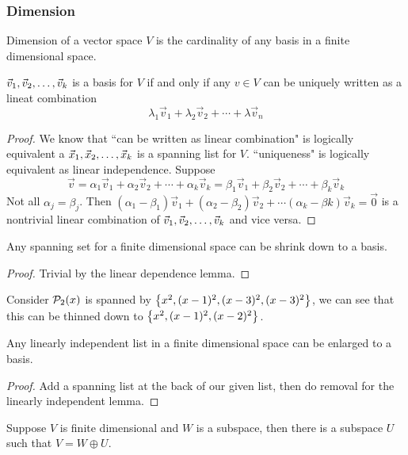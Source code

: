 \subsubsection{Dimension}
\begin{definition}
    Dimension of a vector space $V$ is the cardinality of any basis in a finite dimensional space.
\end{definition}
\begin{proposition}
    ${\vec v}_1,{\vec v}_2, \ldots, {\vec v}_{k}$ is a basis for $V$ if and only if any $v \in V$ can be uniquely written as a lineat combination
    \[ \lambda_1 \vec v_1 + \lambda_2 \vec v_2 + \cdots + \lambda \vec v_n \]
\end{proposition}
\begin{proof}
    We know that ``can be written  as linear combination" is logically equivalent a ${\vec x}_1,{\vec x}_2, \ldots, {\vec x}_{k}$ is a spanning list for $V$. ``uniqueness" is logically equivalent as linear independence. Suppose
    \[ \vec v = \alpha_1 \vec v_1 + \alpha_2 \vec v_2 + \cdots + \alpha_k \vec v_k = \beta_1 \vec v_1 + \beta_2 \vec v_2 + \cdots + \beta_k \vec v_k\]
    Not all $\alpha_j = \beta_j$. Then $(\alpha_1 -\beta_1) \vec v_1 + (\alpha_2 - \beta_2) \vec v_2 + \cdots (\alpha_k - \beta k) \vec v_k = \vec 0$ is a nontrivial linear combination of ${\vec v}_1,{\vec v}_2, \ldots, {\vec v}_{k}$ and vice versa. 
\end{proof}
\begin{theorem}
    Any spanning set for a finite dimensional space can be shrink down to a basis.
\end{theorem}
\begin{proof}
    Trivial by the linear dependence lemma.
\end{proof}
\begin{example}
    Consider $\mathcal P_2(x)$ is spanned by $\left\{ x^2, (x-1)^2, (x-3)^2, (x-3)^2\right\}$, we can see that this can be thinned down to $\left\{ x^2, (x-1)^2, (x-2)^2 \right\}$.
\end{example}
\begin{corollary}
    Any linearly independent list in a finite dimensional space can be enlarged to a basis.
\end{corollary}
\begin{proof}
    Add a spanning list at the back of our given list, then do removal for the linearly independent lemma.
\end{proof}
\begin{theorem}
    Suppose $V$ is finite dimensional and $W$ is a subspace, then there is a subspace $U$ such that $V = W \oplus U$.
\end{theorem}
